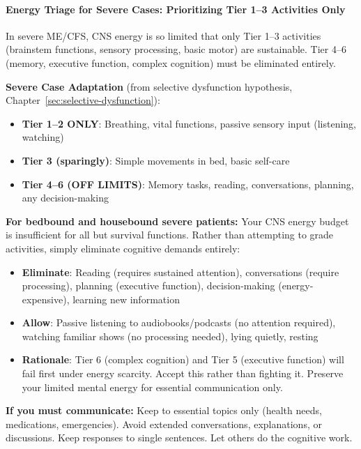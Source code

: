 \paragraph{Energy Triage for Severe Cases: Prioritizing Tier 1--3 Activities Only}

\begin{keypoint}
In severe ME/CFS, CNS energy is so limited that only Tier 1--3 activities (brainstem functions, sensory processing, basic motor) are sustainable. Tier 4--6 (memory, executive function, complex cognition) must be eliminated entirely.

\textbf{Severe Case Adaptation} (from selective dysfunction hypothesis, Chapter~\ref{sec:selective-dysfunction}):
\begin{itemize}
    \item \textbf{Tier 1--2 ONLY}: Breathing, vital functions, passive sensory input (listening, watching)
    \item \textbf{Tier 3 (sparingly)}: Simple movements in bed, basic self-care
    \item \textbf{Tier 4--6 (OFF LIMITS)}: Memory tasks, reading, conversations, planning, any decision-making
\end{itemize}

\end{keypoint}

\begin{recommendation}
\label{rec:severe-cognitive-triage}

\textbf{For bedbound and housebound severe patients:} Your CNS energy budget is insufficient for all but survival functions. Rather than attempting to grade activities, simply eliminate cognitive demands entirely:

\begin{itemize}
    \item \textbf{Eliminate}: Reading (requires sustained attention), conversations (require processing), planning (executive function), decision-making (energy-expensive), learning new information
    \item \textbf{Allow}: Passive listening to audiobooks/podcasts (no attention required), watching familiar shows (no processing needed), lying quietly, resting
    \item \textbf{Rationale}: Tier 6 (complex cognition) and Tier 5 (executive function) will fail first under energy scarcity. Accept this rather than fighting it. Preserve your limited mental energy for essential communication only.
\end{itemize}

\textbf{If you must communicate:} Keep to essential topics only (health needs, medications, emergencies). Avoid extended conversations, explanations, or discussions. Keep responses to single sentences. Let others do the cognitive work.

\end{recommendation}

